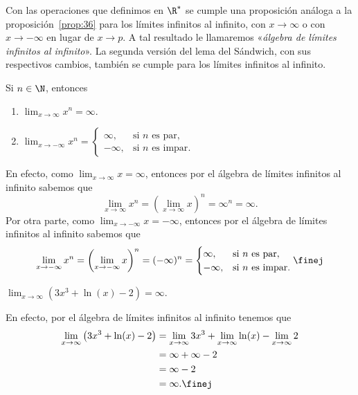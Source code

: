 \documentclass[12pt,a4paper]{book}
\begin{document}
    \begin{observacion}\label{obs:17}
        Con las operaciones que definimos en $\R^{*}$ se cumple una
        proposición análoga a la proposición~\ref{prop:36} para los límites infinitos al infinito,
        con $x\to\infty$ o con $x\to-\infty$ en lugar de $x\to p$. A tal resultado le llamaremos
        «\textit{álgebra de límites infinitos al infinito}». La segunda versión del lema del
        Sándwich, con sus respectivos cambios, también se cumple para los límites
        infinitos al infinito.
    \end{observacion}

    \begin{ejemplo}\label{ejm:65}
        Si $n\in\N$, entonces
        \begin{enumerate}[nosep]
            \item $\lim_{x\to\infty}x^{n}=\infty$.
            \item $\lim_{x\to-\infty}x^{n}=\begin{cases}\infty, & \text{si }n\text{ es par},\\ -\infty, & \text{si }n\text{ es impar}.\end{cases}$
        \end{enumerate}
        En efecto, como $\lim_{x\to\infty}x=\infty$, entonces por el álgebra de límites infinitos
        al infinito sabemos que
        \begin{equation*}
            \lim_{x\to\infty}x^{n}=\left(\lim_{x\to\infty}x\right)^{n}=\infty^{n}=\infty.
        \end{equation*}
        Por otra parte, como $\lim_{x\to-\infty}x=-\infty$, entonces por el álgebra de límites
        infinitos al infinito sabemos que
        \begin{equation*}
            \lim_{x\to-\infty}x^{n}=\left(\lim_{x\to-\infty}x\right)^{n}=(-\infty)^{n}=\begin{cases}\infty, & \text{si }n\text{ es par},\\ -\infty, & \text{si }n\text{ es impar}.\end{cases}\finej
        \end{equation*}
    \end{ejemplo}

    \begin{ejemplo}\label{ejm:66}
        $\lim_{x\to\infty}\left(3x^{3}+\ln(x)-2\right)=\infty$.

        En efecto, por el álgebra de límites infinitos al infinito tenemos que
        \begin{align*}
            \lim_{x\to\infty}\left(3x^{3}+\ln(x)-2\right)&=\lim_{x\to\infty}3x^{3}+\lim_{x\to\infty}\ln(x)-\lim_{x\to\infty}2\\
            &=\infty+\infty-2\\
            &=\infty-2\\
            &=\infty.\finej
        \end{align*}
    \end{ejemplo}
\end{document}
